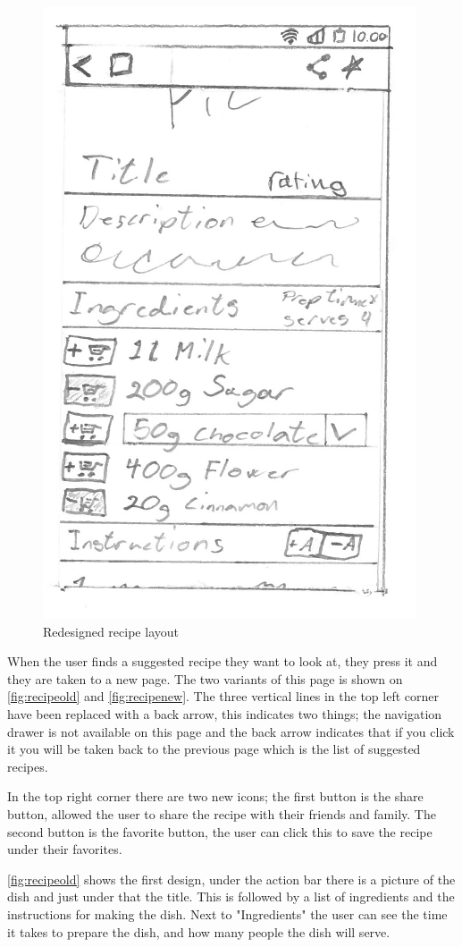 \begin{figure}[H]
\begin{minipage}[b]{0.5\columnwidth}
\centering
\includegraphics[width=0.7\columnwidth]{img/prototypes/recipe_new.pdf}
\caption{Redesigned recipe layout\label{fig:recipenew}}
\end{minipage}
\end{figure}

When the user finds a suggested recipe they want to look at, they press it and they are taken to a new page. The two variants of this page is shown on \autoref{fig:recipeold} and \autoref{fig:recipenew}. The three vertical lines in the top left corner have been replaced with a back arrow, this indicates two things; the navigation drawer is not available on this page and the back arrow indicates that if you click it you will be taken back to the previous page which is the list of suggested recipes. 

In the top right corner there are two new icons; the first button is the share button, allowed the user to share the recipe with their friends and family. The second button is the favorite button, the user can click this to save the recipe under their favorites.

\autoref{fig:recipeold} shows the first design, under the action bar there is a picture of the dish and just under that the title. This is followed by a list of ingredients and the instructions for making the dish. Next to "Ingredients" the user can see the time it takes to prepare the dish, and how many people the dish will serve. 

